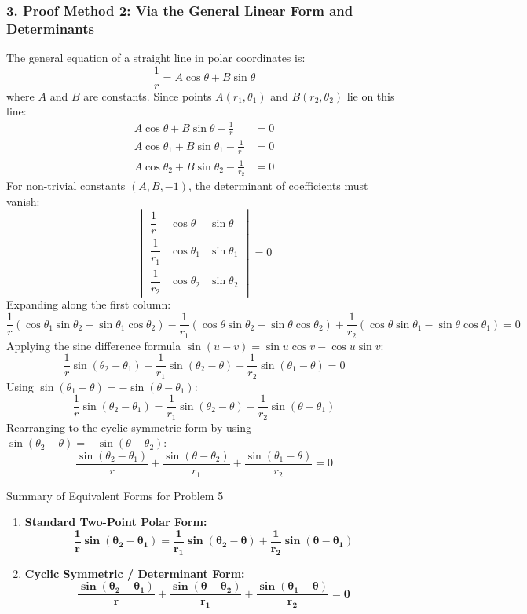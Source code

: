 \documentclass[11pt,a4paper]{article}
\begin{document}
\subsubsection*{3. Proof Method 2: Via the General Linear Form and Determinants}
The general equation of a straight line in polar coordinates is:
\[
\frac{1}{r} = A\cos\theta + B\sin\theta
\]
where $A$ and $B$ are constants. Since points $A(r_1, \theta_1)$ and $B(r_2, \theta_2)$ lie on this line:
\begin{align}
A\cos\theta + B\sin\theta - \frac{1}{r} &= 0 \label{eq:det1}\\
A\cos\theta_1 + B\sin\theta_1 - \frac{1}{r_1} &= 0 \label{eq:det2}\\
A\cos\theta_2 + B\sin\theta_2 - \frac{1}{r_2} &= 0 \label{eq:det3}
\end{align}
For non-trivial constants $(A, B, -1)$, the determinant of coefficients must vanish:
\[
\begin{vmatrix}
\dfrac{1}{r} & \cos\theta & \sin\theta \\[2mm]
\dfrac{1}{r_1} & \cos\theta_1 & \sin\theta_1 \\[2mm]
\dfrac{1}{r_2} & \cos\theta_2 & \sin\theta_2
\end{vmatrix} = 0
\]
Expanding along the first column:
\[
\frac{1}{r}(\cos\theta_1\sin\theta_2 - \sin\theta_1\cos\theta_2) - \frac{1}{r_1}(\cos\theta\sin\theta_2 - \sin\theta\cos\theta_2) + \frac{1}{r_2}(\cos\theta\sin\theta_1 - \sin\theta\cos\theta_1) = 0
\]
Applying the sine difference formula $\sin(u - v) = \sin u\cos v - \cos u\sin v$:
\[
\frac{1}{r}\sin(\theta_2 - \theta_1) - \frac{1}{r_1}\sin(\theta_2 - \theta) + \frac{1}{r_2}\sin(\theta_1 - \theta) = 0
\]
Using $\sin(\theta_1 - \theta) = -\sin(\theta - \theta_1)$:
\[
\frac{1}{r}\sin(\theta_2 - \theta_1) = \frac{1}{r_1}\sin(\theta_2 - \theta) + \frac{1}{r_2}\sin(\theta - \theta_1)
\]
Rearranging to the cyclic symmetric form by using $\sin(\theta_2 - \theta) = -\sin(\theta - \theta_2)$:
\[
\frac{\sin(\theta_2 - \theta_1)}{r} + \frac{\sin(\theta - \theta_2)}{r_1} + \frac{\sin(\theta_1 - \theta)}{r_2} = 0
\]

\vspace{3mm}
\noindent
\begin{ansbox}{Summary of Equivalent Forms for Problem 5}
\begin{enumerate}\setlength{\itemsep}{2pt}
    \item \textbf{Standard Two-Point Polar Form:}
    \[
    \mathbf{\frac{1}{r}\sin(\theta_2 - \theta_1) = \frac{1}{r_1}\sin(\theta_2 - \theta) + \frac{1}{r_2}\sin(\theta - \theta_1)}
    \]
    \item \textbf{Cyclic Symmetric / Determinant Form:}
    \[
    \mathbf{\frac{\sin(\theta_2 - \theta_1)}{r} + \frac{\sin(\theta - \theta_2)}{r_1} + \frac{\sin(\theta_1 - \theta)}{r_2} = 0}
    \]
\end{enumerate}
\end{ansbox}
\end{document}
